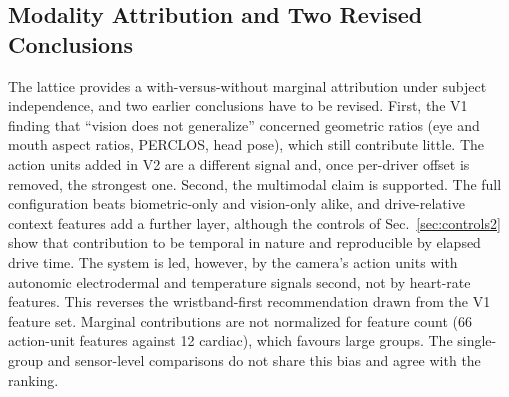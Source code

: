\documentclass[journal]{IEEEtran}
\begin{document}
\subsection{Modality Attribution and Two Revised Conclusions}
The lattice provides a with-versus-without marginal attribution under subject
independence, and two earlier conclusions have to be revised. First, the V1
finding that ``vision does not generalize'' concerned geometric ratios (eye
and mouth aspect ratios, PERCLOS, head pose), which still contribute little.
The action units added in V2 are a different signal and, once per-driver
offset is removed, the strongest one. Second, the multimodal claim is
supported. The full configuration beats biometric-only and vision-only alike,
and drive-relative context features add a further layer, although the controls
of Sec.~\ref{sec:controls2} show that contribution to be temporal in nature and
reproducible by elapsed drive time. The system is led,
however, by the camera's action units with autonomic electrodermal and
temperature signals second, not by heart-rate features. This reverses the
wristband-first recommendation drawn from the V1 feature set. Marginal
contributions are not normalized for feature count (66 action-unit features
against 12 cardiac), which favours large groups. The single-group and
sensor-level comparisons do not share this bias and agree with the ranking.
\end{document}
